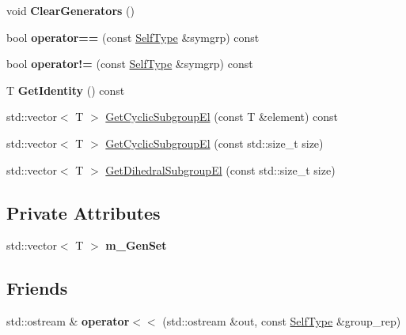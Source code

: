 \begin{DoxyCompactItemize}
\item 
\hypertarget{classcSymmetricRep_a37c8cab52b7ef4aa4b83f3ef203036ef}{void {\bfseries Clear\-Generators} ()}\label{classcSymmetricRep_a37c8cab52b7ef4aa4b83f3ef203036ef}

\item 
\hypertarget{classcSymmetricRep_a30639c704b01408475c9fd4a100d738d}{bool {\bfseries operator==} (const \hyperlink{classcSymmetricRep}{Self\-Type} \&symgrp) const }\label{classcSymmetricRep_a30639c704b01408475c9fd4a100d738d}

\item 
\hypertarget{classcSymmetricRep_a77bcf4f11ff92c57aa6626c075bf3355}{bool {\bfseries operator!=} (const \hyperlink{classcSymmetricRep}{Self\-Type} \&symgrp) const }\label{classcSymmetricRep_a77bcf4f11ff92c57aa6626c075bf3355}

\item 
\hypertarget{classcSymmetricRep_a5182c5dcf4247c03a7e0de001e7c1cf3}{T {\bfseries Get\-Identity} () const }\label{classcSymmetricRep_a5182c5dcf4247c03a7e0de001e7c1cf3}

\item 
std\-::vector$<$ T $>$ \hyperlink{classcSymmetricRep_a2dfa5d3358d69914a625536d994be72c}{Get\-Cyclic\-Subgroup\-El} (const T \&element) const 
\item 
std\-::vector$<$ T $>$ \hyperlink{classcSymmetricRep_ac110028d8d6e161448f15bc1548d5274}{Get\-Cyclic\-Subgroup\-El} (const std\-::size\-\_\-t size)
\item 
std\-::vector$<$ T $>$ \hyperlink{classcSymmetricRep_a4a9724dc8ba8c8ccc041fe1f86dc4701}{Get\-Dihedral\-Subgroup\-El} (const std\-::size\-\_\-t size)
\end{DoxyCompactItemize}
\subsection*{Private Attributes}
\begin{DoxyCompactItemize}
\item 
\hypertarget{classcSymmetricRep_ab9afa5a928d6fba3c560e0245ab5d0e4}{std\-::vector$<$ T $>$ {\bfseries m\-\_\-\-Gen\-Set}}\label{classcSymmetricRep_ab9afa5a928d6fba3c560e0245ab5d0e4}

\end{DoxyCompactItemize}
\subsection*{Friends}
\begin{DoxyCompactItemize}
\item 
\hypertarget{classcSymmetricRep_ad73abea0c910e6d44cac98fd4bc1a8a8}{std\-::ostream \& {\bfseries operator$<$$<$} (std\-::ostream \&out, const \hyperlink{classcSymmetricRep}{Self\-Type} \&group\-\_\-rep)}\label{classcSymmetricRep_ad73abea0c910e6d44cac98fd4bc1a8a8}

\end{DoxyCompactItemize}


